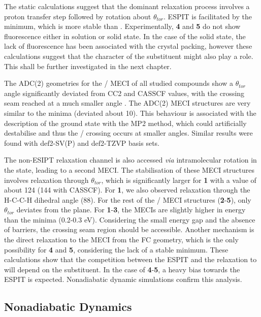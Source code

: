 The static calculations suggest that the dominant relaxation process involves a proton transfer step followed by rotation about $\theta_{tor}$. ESPIT is facilitated by the \Kstar{} minimum, which is more stable than \Estar. Experimentally, \textbf{4} and \textbf{5} do not show fluorescence either in solution or solid state. In the case of the solid state, the lack of fluorescence has been associated with the crystal packing, however these calculations suggest that the character of the substituent might also play a role. This shall be further investigated in the next chapter.

The ADC(2) geometries for the \Kstar{} \sone/\szero{} MECI of all studied compounds show a $\theta_{tor}$ angle significantly deviated from CC2 and CASSCF values, with the crossing seam reached at a much smaller angle . The ADC(2) MECI structures are very similar to the \Kstar{} minima (deviated about 10\textdegree{}). This behaviour is associated with the description of the ground state with the MP2 method, which could artificially destabilise \szero{} and thus the \sone/\szero{}  crossing occurs at smaller angles. Similar results were found with def2-SV(P) and def2-TZVP basis sets.

The non-ESIPT relaxation channel is also accessed \textit{via} intramolecular rotation in the \Estar{} state, leading to a second MECI. The stabilisation of these MECI structures involves relaxation through $\theta_{tor}$, which is significantly larger for \textbf{1} with a value of about 124\textdegree{} (144\textdegree{} with CASSCF). For \textbf{1}, we also observed relaxation through the H-C-C-H dihedral angle (88\textdegree{}). For the rest of the \sone/\szero{} MECI structures (\textbf{2}-\textbf{5}), only $\theta_{tor}$ deviates from the plane. For \textbf{1}-\textbf{3}, the \Estar{} MECIs are slightly higher in energy than the \Estar{} minima (0.2-0.3 eV).  Considering the small energy gap and the absence of barriers, the crossing seam region should be accessible. Another mechanism is the direct relaxation to the MECI from the FC geometry, which is the only possibility for \textbf{4} and \textbf{5}, considering the lack of a stable \Estar{} minimum. These calculations show that the competition between the ESPIT and the relaxation to \Estar{} will depend on the substituent. In the case of \textbf{4}-\textbf{5}, a heavy bias towards the ESPIT is expected. Nonadiabatic dynamic simulations confirm this analysis. 
\subsection{Nonadiabatic Dynamics}\label{section: NRdecay_Dynamics}

